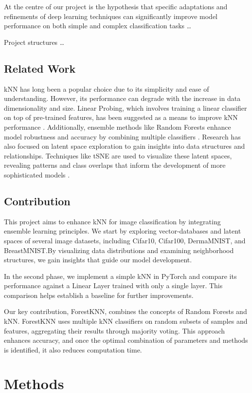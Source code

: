 \documentclass[a4paper]{article}
\begin{document}
At the centre of our project is the hypothesis that specific adaptations and refinements of deep learning techniques can significantly improve model performance on both simple and complex classification tasks
\dots

Project structures
\dots


\subsection{Related Work}
kNN has long been a popular choice due to its simplicity and ease of understanding. However, its performance can degrade with the increase in data dimensionality and size. Linear Probing, which involves training a linear classifier on top of pre-trained features, has been suggested as a means to improve kNN performance \citep{Alain2016}. Additionally, ensemble methods like Random Forests enhance model robustness and accuracy by combining multiple classifiers \citep{Breiman2001}. Research has also focused on latent space exploration to gain insights into data structures and relationships. Techniques like tSNE are used to visualize these latent spaces, revealing patterns and class overlaps that inform the development of more sophisticated models \citep{Maaten2008}.

\subsection{Contribution}
This project aims to enhance kNN for image classification by integrating ensemble learning principles. We start by exploring vector-databases and latent spaces of several image datasets, including Cifar10, Cifar100, DermaMNIST, and BreastMNIST.\@ By visualizing data distributions and examining neighborhood structures, we gain insights that guide our model development.

In the second phase, we implement a simple kNN in PyTorch and compare its performance against a Linear Layer trained with only a single layer. This comparison helps establish a baseline for further improvements.

Our key contribution, ForestKNN, combines the concepts of Random Forests and kNN. ForestKNN uses multiple kNN classifiers on random subsets of samples and features, aggregating their results through majority voting. This approach enhances accuracy, and once the optimal combination of parameters and methods is identified, it also reduces computation time. 


\section{Methods}\label{methods}
\end{document}
